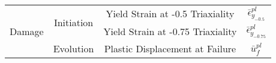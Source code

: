 \begin{table}[]
\begin{tabular}{cccc}
\multirow{3}{*}{Damage}  & \multirow{2}{*}{Initiation}                                                            & Yield Strain at -0.5 Triaxiality   & $\bar{\epsilon}^{pl}_{y_{-0.5}}$  \\
                         &                                                                                        & Yield Strain at -0.75 Triaxiality  & $\bar{\epsilon}^{pl}_{y_{-0.75}}$ \\
                         & Evolution                                                                              & Plastic Displacement at Failure    & $\bar{u}^{pl}_f$                  \\ \hline
\end{tabular}
\end{table}